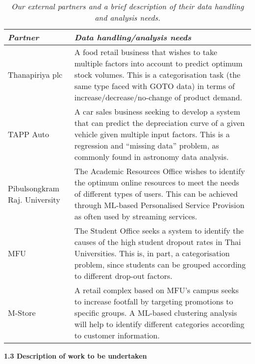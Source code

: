 \documentclass[11pt]{article}
\begin{document}
  \begin{table}[h]
  \begin{tabular}{p{2.8cm}|p{13.4cm}}
    {\it Partner} & {\it Data handling/analysis needs}\\
    \hline
    \hline
      Thanapiriya plc & A food retail business that wishes to take multiple factors into account to predict optimum stock volumes. This is a categorisation task (the same type faced with GOTO data) in terms of increase/decrease/no-change of product demand.\\
    \hline
      TAPP Auto & A car sales business seeking to develop a system that can predict the depreciation curve of a given vehicle given multiple input factors. This is a regression and ``missing data'' problem, as commonly found in astronomy data analysis.\\
    \hline
       Pibulsongkram Raj. University & The Academic Resources Office wishes to identify the optimum online resources to meet the needs of different types of users. This can be achieved through ML-based Personalised Service Provision as often used by streaming services.\\
    \hline
      MFU & The Student Office seeks a system to identify the causes of the high student dropout rates in Thai Universities. This is, in part, a categorisation problem, since students can be grouped according to different drop-out factors. \\
    \hline
      M-Store & A retail complex based on MFU's campus seeks to increase footfall by targeting promotions to specific groups. A ML-based clustering analysis will help to identify different categories according to customer information. \\
    \hline
  \end{tabular}
  \caption{\it Our external partners and a brief description of their data handling and analysis needs. }
  \vspace{-5mm}
  \end{table}
  \vspace{3mm}
  \noindent
  {\large \bf 1.3 Description of work to be undertaken}
  
\end{document}
